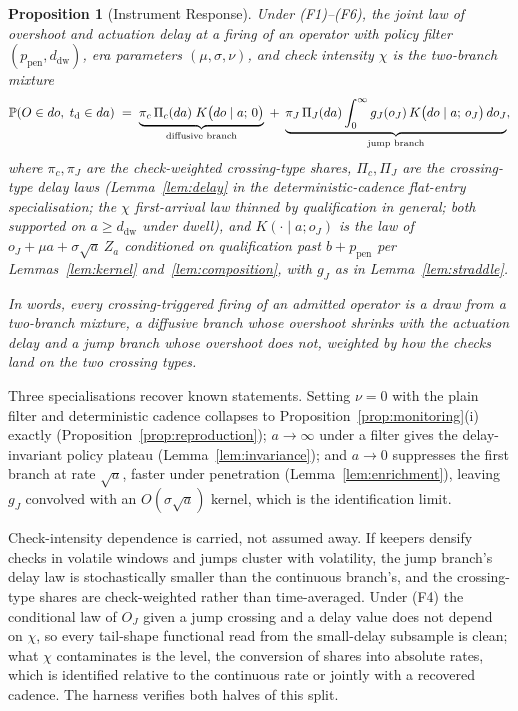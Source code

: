 \documentclass[11pt,a4paper]{article}
\theoremstyle{definition}
\theoremstyle{plain}
\newtheorem{proposition}{Proposition}
\theoremstyle{remark}
\newcommand{\tact}{t_{\mathrm{d}}}
\begin{document}
\begin{proposition}[Instrument Response]\label{prop:mixture}
Under (F1)--(F6), the joint law of overshoot and actuation delay at a firing of an operator with policy filter $(p_{\mathrm{pen}},d_{\mathrm{dw}})$, era parameters $(\mu, \sigma, \nu)$, and check
intensity $\chi$ is the two-branch mixture
\[
\mathbb{P}(O \in do,\; \tact \in da)
\;=\; \underbrace{\pi_c\, \Pi_c(da)\; K\big(do \mid a;\,
0\big)}_{\textnormal{diffusive branch}}
\;+\; \underbrace{\pi_J\, \Pi_J(da) \int_0^\infty g_J(o_J)\,
K\big(do \mid a;\, o_J\big)\, do_J}_{\textnormal{jump branch}},
\]
where $\pi_c, \pi_J$ are the check-weighted crossing-type shares, $\Pi_c, \Pi_J$ are the crossing-type delay laws
(Lemma~\ref{lem:delay} in the deterministic-cadence flat-entry
specialisation; the $\chi$ first-arrival law thinned by qualification in general; both supported on $a \ge d_{\mathrm{dw}}$ under dwell), and $K(\cdot \mid a; o_J)$ is the law of $o_J + \mu a
+ \sigma\sqrt{a}\, Z_a$ conditioned on qualification past $b + p_{\mathrm{pen}}$ per Lemmas~\ref{lem:kernel} and~\ref{lem:composition}, with $g_J$ as in Lemma~\ref{lem:straddle}.
\end{proposition}

\emph{In words, every crossing-triggered firing of an admitted operator is a draw from a two-branch mixture, a diffusive branch whose overshoot shrinks with the actuation delay
and a jump branch whose overshoot does not, weighted by how the checks land on the two crossing types.}

Three specialisations recover known statements. Setting $\nu = 0$ with the plain filter and deterministic cadence collapses to Proposition~\ref{prop:monitoring}(i) exactly 
(Proposition~\ref{prop:reproduction}); $a \to \infty$ under a filter gives the delay-invariant policy plateau (Lemma~\ref{lem:invariance}); and $a \to 0$ suppresses the first
branch at rate $\sqrt{a}$, faster under penetration (Lemma~\ref{lem:enrichment}), leaving $g_J$ convolved with an $O(\sigma\sqrt{a})$ kernel, which is the identification limit.

Check-intensity dependence is carried, not assumed away. If keepers densify checks in volatile windows and jumps cluster with volatility, the jump branch's delay law is stochastically smaller 
than the continuous branch's, and the crossing-type shares are check-weighted rather than time-averaged. Under (F4) the conditional law of $O_J$ given a jump crossing and a delay value 
does not depend on $\chi$, so every tail-shape functional read from the small-delay subsample is clean; what $\chi$ contaminates is the level, the conversion of shares into absolute rates, which is
identified relative to the continuous rate or jointly with a recovered cadence. The harness verifies both halves of this split.
\end{document}

